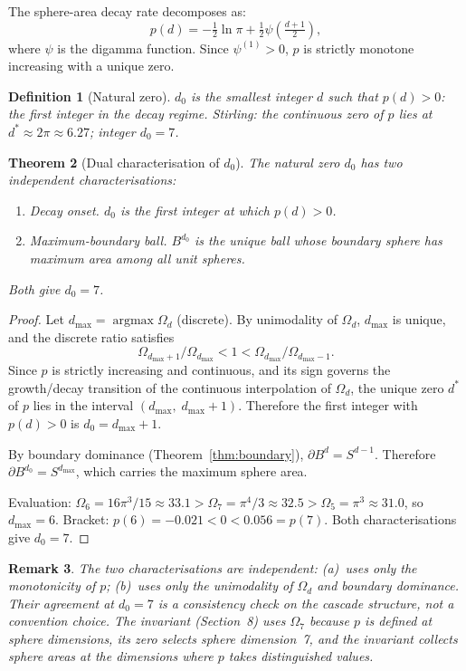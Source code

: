 \documentclass[11pt,a4paper]{article}
\newtheorem{theorem}{Theorem}[section]
\newtheorem{definition}[theorem]{Definition}
\newtheorem{remark}[theorem]{Remark}
\begin{document}
The sphere-area decay rate decomposes as:
\[
p(d) = -\tfrac{1}{2}\ln\pi +
\tfrac{1}{2}\psi\!\left(\tfrac{d+1}{2}\right),
\]
where $\psi$ is the digamma function. Since $\psi^{(1)} > 0$, $p$ is
strictly monotone increasing with a unique zero.

\begin{definition}[Natural zero]\label{def:d0}
$d_0$ is the smallest integer $d$ such that $p(d) > 0$: the first
integer in the decay regime. Stirling: the continuous zero of $p$ lies at
$d^*\approx 2\pi\approx 6.27$; integer $d_0 = 7$.
\end{definition}

\begin{theorem}[Dual characterisation of $d_0$]\label{thm:dual}
The natural zero $d_0$ has two independent characterisations:
\begin{enumerate}
\item[(a)] \emph{Decay onset.} $d_0$ is the first integer at which
$p(d) > 0$.
\item[(b)] \emph{Maximum-boundary ball.} $B^{d_0}$ is the unique ball
whose boundary sphere has maximum area among all unit spheres.
\end{enumerate}
Both give $d_0 = 7$.
\end{theorem}

\begin{proof}
Let $d_{\max} = \operatorname{argmax}\Omega_d$ (discrete). By
unimodality of $\Omega_d$, $d_{\max}$ is unique, and the discrete ratio
satisfies
\[
\Omega_{d_{\max}+1}/\Omega_{d_{\max}} < 1 < \Omega_{d_{\max}}/\Omega_{d_{\max}-1}.
\]
Since $p$ is strictly increasing and continuous, and its sign governs
the growth/decay transition of the continuous interpolation of $\Omega_d$,
the unique zero $d^*$ of $p$ lies in the interval
$(d_{\max},\;d_{\max}+1)$. Therefore the first integer with $p(d) > 0$ is
$d_0 = d_{\max} + 1$.

By boundary dominance (Theorem~\ref{thm:boundary}),
$\partial B^d = S^{d-1}$. Therefore
$\partial B^{d_0} = S^{d_{\max}}$, which carries the maximum sphere area.

Evaluation: $\Omega_6 = 16\pi^3/15\approx 33.1 > \Omega_7 = \pi^4/3
\approx 32.5 > \Omega_5 = \pi^3\approx 31.0$, so $d_{\max} = 6$.
Bracket: $p(6) = -0.021 < 0 < 0.056 = p(7)$. Both characterisations
give $d_0 = 7$.
\end{proof}

\begin{remark}\label{rem:convention}
The two characterisations are independent: (a)~uses only the
monotonicity of $p$; (b)~uses only the unimodality of $\Omega_d$ and
boundary dominance. Their agreement at $d_0 = 7$ is a consistency check
on the cascade structure, not a convention choice. The invariant
(Section~8) uses $\Omega_7$ because $p$ is defined at sphere dimensions,
its zero selects sphere dimension~7, and the invariant collects sphere
areas at the dimensions where $p$ takes distinguished values.
\end{remark}
\end{document}

